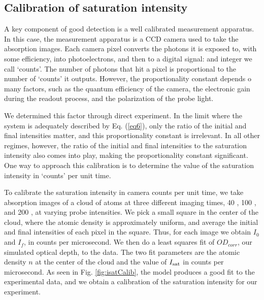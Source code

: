 \documentclass[12pt]{iopart}
\begin{document}
\subsection{Calibration of saturation intensity}
A key component of good detection is a well calibrated measurement apparatus. In this case, the measurement apparatus is a CCD camera used to take the absorption images.  Each camera pixel  converts the photons it is exposed to, with some efficiency, into photoelectrons, and then to a digital signal: and integer we  call  `counts'. The number of photons that hit a pixel is proportional to the number of `counts' it outputs. However, the proportionality constant depends o many factors, such as the quantum efficiency of the camera, the electronic gain during the readout process, and the polarization of the probe light. 
\par We determined this factor through direct experiment. In the limit where the system is adequately described by Eq. (\ref{eq6}), only the ratio of the initial and final intensities matter, and this proportionality constant is irrelevant. In all other regimes, however, the ratio of the initial and final intensities to the saturation intensity also comes into play, making the proportionality constant significant. One way to approach this calibration is to determine the value of the saturation intensity in `counts' per unit time. 
\par To calibrate the saturation intensity in camera counts per unit time, we take absorption images of a cloud of \K{} atoms at three different imaging times, 40 \us{}, 100 \us{}, and 200 \us{}, at varying probe intensities. We pick a small square in the center of the cloud, where the atomic density is approximately uniform, and average the initial and final intensities of each pixel in the square. Thus, for each image we obtain $I_0$ and $I_f$, in counts per microsecond. We then do a least squares fit of $OD_{corr}$, our simulated optical depth, to the data. The two fit parameters are the atomic density $n$ at the center of the cloud and the value of $I_{\rm{sat}}$ in counts per microsecond. As seen in Fig. \ref{fig:isatCalib}, the model produces a good fit to the experimental data, and we obtain a calibration of the saturation intensity for our experiment. 
\end{document}
